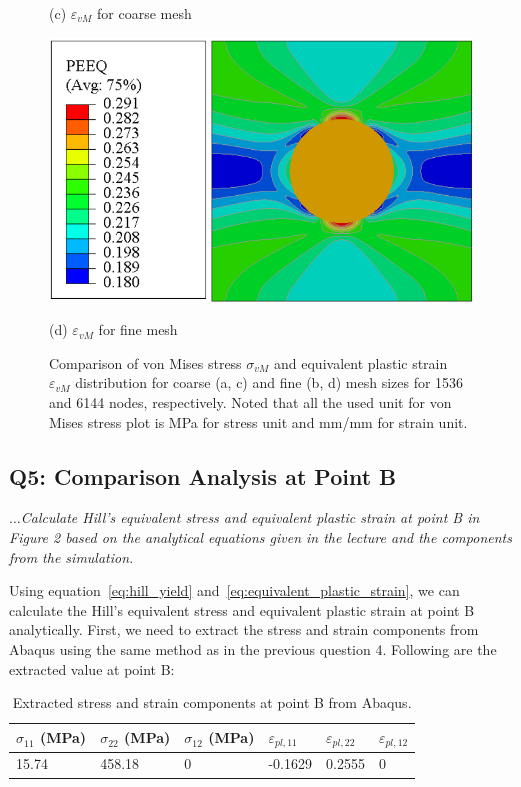 \documentclass[12pt]{article}
\begin{document}
\begin{figure}[H]
\begin{minipage}{0.48\textwidth}
        \caption*{(c) $\varepsilon_{vM}$ for coarse mesh}
    \end{minipage}
    \hfill
    \begin{minipage}{0.48\textwidth}
        \centering
        \includegraphics[width=\textwidth]{images/PEEQ_Fine.png}
        \caption*{(d) $\varepsilon_{vM}$ for fine mesh}
    \end{minipage}
    \caption{Comparison of von Mises stress $\sigma_{vM}$ and equivalent plastic strain $\varepsilon_{vM}$ distribution 
    for coarse (a, c) and fine (b, d) mesh 
    sizes for 1536 and 6144 nodes, respectively. Noted that all the used unit for von Mises stress plot is MPa for stress unit 
    and mm/mm for strain unit.}
    \label{fig:stressFields}
\end{figure}

\newpage
\subsection*{Q5: Comparison Analysis at Point B}
\textit{$\dots$Calculate Hill’s equivalent stress and equivalent plastic strain at point B in Figure 2 based on
the analytical equations given in the lecture and the components from the simulation.}
\vspace{1em}

Using equation~\ref{eq:hill_yield} and~\ref{eq:equivalent_plastic_strain}, we can calculate the Hill's equivalent stress and 
equivalent plastic strain at point B analytically. First, we need to extract the stress and strain
components from Abaqus using the same method as in the previous question 4. Following are the extracted value
at point B:

\begin{table}[H]
    \centering
    \caption{Extracted stress and strain components at point B from Abaqus.}
    \label{tab:pointA-results}
    \begin{tabular}{llllll}
        \toprule
        $\sigma_{11}$ (MPa) & $\sigma_{22}$ (MPa) & $\sigma_{12}$ (MPa) & $\varepsilon_{pl,11}$ & $\varepsilon_{pl,22}$ & $\varepsilon_{pl,12}$\\
        \midrule
        15.74 & 458.18 & 0 & -0.1629 & 0.2555 & 0\\
        \bottomrule
    \end{tabular}
\end{table}
\end{document}

